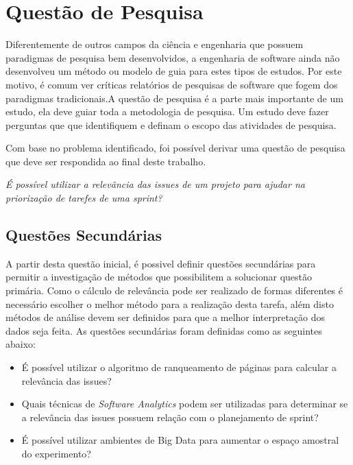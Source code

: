 \section{Questão de Pesquisa}
\label{int:que}
Diferentemente de outros campos da ciência e engenharia que possuem paradigmas de
pesquisa bem desenvolvidos, a engenharia de software ainda não desenvolveu um
método ou modelo de guia para estes tipos de estudos. Por este motivo, é
comum ver críticas relatórios de pesquisas de software que fogem dos paradigmas
tradicionais\cite{shaw}.A questão de pesquisa é a parte mais importante de um estudo, ela deve guiar toda
a metodologia de pesquisa. Um estudo deve fazer perguntas que que identifiquem e
definam o escopo das atividades de pesquisa\cite{guidelines}.

Com base no problema identificado, foi possível derivar uma questão de pesquisa
que deve ser respondida ao final deste trabalho.

\begin{center}
    \textit{É possível utilizar a relevância das issues de um projeto para ajudar
    na priorização de tarefes de uma sprint?}
\end{center}

\subsection{Questões Secundárias}
\label{int:que:sec}
A partir desta questão inicial, é possivel definir questões secundárias para
permitir  a investigação de métodos que possibilitem a solucionar questão primária.
Como o cálculo de relevância pode ser realizado
de formas diferentes é necessário escolher o melhor método para a realização
desta tarefa, além disto métodos de análise devem ser definidos para que
a melhor interpretação dos dados seja feita. As questões secundárias
foram definidas como as seguintes abaixo:

\begin{itemize}
    \item É possível utilizar o algoritmo de ranqueamento de páginas para calcular a relevância das issues?
    \item Quais técnicas de \textit{Software Analytics} podem ser utilizadas para
        determinar se a relevância das issues possuem relação com o planejamento
        de sprint?
    \item É possível utilizar ambientes de Big Data para aumentar o espaço amostral
        do experimento?
\end{itemize}


